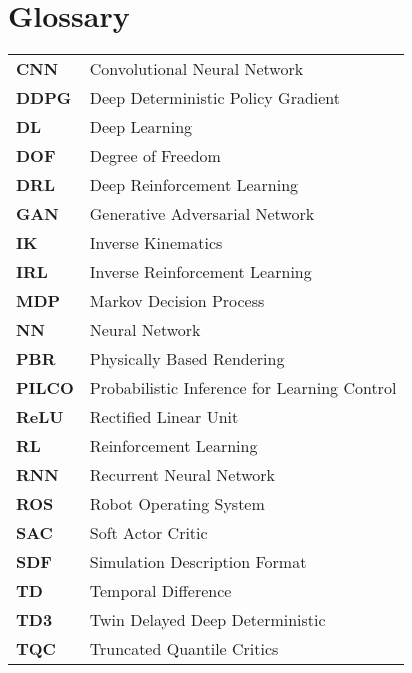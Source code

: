 %
\chapter*{Glossary}

\capstartfalse
\begin{table}[!hb]
    \begin{tabular}{ll}
        \textbf{CNN}   & Convolutional Neural Network                 \\
        \textbf{DDPG}  & Deep Deterministic Policy Gradient           \\
        \textbf{DL}    & Deep Learning                                \\
        \textbf{DOF}   & Degree of Freedom                            \\
        \textbf{DRL}   & Deep Reinforcement Learning                  \\
        \textbf{GAN}   & Generative Adversarial Network               \\
        \textbf{IK}    & Inverse Kinematics                           \\
        \textbf{IRL}   & Inverse Reinforcement Learning               \\
        \textbf{MDP}   & Markov Decision Process                      \\
        \textbf{NN}    & Neural Network                               \\
        \textbf{PBR}   & Physically Based Rendering                   \\
        \textbf{PILCO} & Probabilistic Inference for Learning Control \\
        \textbf{ReLU}  & Rectified Linear Unit                        \\
        \textbf{RL}    & Reinforcement Learning                       \\
        \textbf{RNN}   & Recurrent Neural Network                     \\
        \textbf{ROS}   & Robot Operating System                       \\
        \textbf{SAC}   & Soft Actor Critic                            \\
        \textbf{SDF}   & Simulation Description Format                \\
        \textbf{TD}    & Temporal Difference                          \\
        \textbf{TD3}   & Twin Delayed Deep Deterministic              \\
        \textbf{TQC}   & Truncated Quantile Critics                   \\
    \end{tabular}
\end{table}
\capstarttrue
